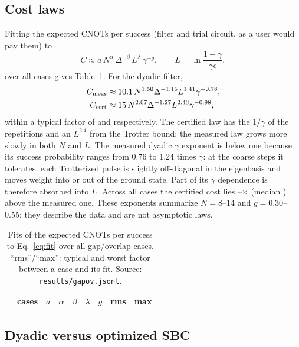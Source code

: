 \documentclass[aps,pra,twocolumn,superscriptaddress,nofootinbib]{revtex4-2}
\begin{document}
\subsection{Cost laws}

Fitting the expected CNOTs per success (filter and trial circuit, as a user would pay them) to
\begin{equation}
C\approx a\,N^{\alpha}\,\Delta^{-\beta}\,L^{\lambda}\,\gamma^{-g},\qquad L=\ln\frac{1-\gamma}{\gamma\epsilon},
\label{eq:fit}
\end{equation}
over all \goNcases{} cases gives Table~\ref{tab:gofit}. For the dyadic filter,
\begin{align}
C_{\rm meas}&\approx10.1\,N^{1.50}\Delta^{-1.15}L^{1.41}\gamma^{-0.78},\\
C_{\rm cert}&\approx15\,N^{2.07}\Delta^{-1.27}L^{2.43}\gamma^{-0.98},
\end{align}
within a typical factor of \goMDrms{} and \goCDrms{} respectively. The certified law has the $1/\gamma$ of
the repetitions and an $L^{2.4}$ from the Trotter bound; the measured law grows more slowly in both $N$ and
$L$. The measured dyadic $\gamma$ exponent is below one because its success probability ranges from 0.76
to 1.24 times $\gamma$: at the coarse steps it tolerates, each Trotterized pulse is slightly off-diagonal in
the eigenbasis and moves weight into or out of the ground state. Part of its $\gamma$ dependence is
therefore absorbed into $L$. Across all cases the certified cost lies
\goCertRatioMin--\goCertRatioMax$\times$ (median \goCertRatioMed) above the measured one. These exponents
summarize $N=8$--14 and $g=0.30$--0.55; they describe the data and are not asymptotic laws.

\begin{table}[t]
\caption{Fits of the expected CNOTs per success to Eq.~\eqref{eq:fit} over all \goNcases{} gap/overlap
cases. ``rms''/``max'': typical and worst factor between a case and its fit. Source:
\texttt{results/gapov.jsonl}.}
\label{tab:gofit}
\begin{ruledtabular}
\begin{tabular}{lrrrrrrrr}
 & cases & $a$ & $\alpha$ & $\beta$ & $\lambda$ & $g$ & rms & max\\
\midrule

\end{tabular}
\end{ruledtabular}
\end{table}

\subsection{Dyadic versus optimized SBC}
\label{sec:dyaopt}
\end{document}
